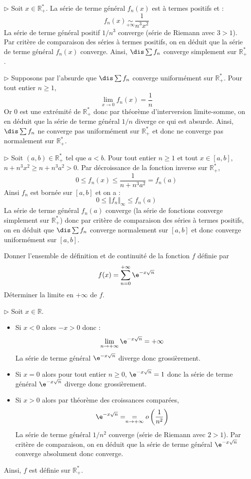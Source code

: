 \documentclass[a4paper,10pt]{report}
\begin{document}
\noindent $\rhd$ Soit $x \in \mathbb{R}_+^*$. La série de terme général $f_n(x)$ est à termes positifs et :
$$ f_n(x) \underset{+ \infty}{\sim} \dfrac{1}{n^3x^2}$$
La série de terme général positif $1/n^3$ converge (série de Riemann avec $3>1$). Par critère de comparaison des séries à termes positifs, on en déduit que la série de terme général $f_n(x)$ converge. Ainsi, $\dis \sum f_n$ converge simplement sur $\mathbb{R}_+^*$.

\medskip

\noindent $\rhd$ Supposons par l'absurde que $\dis \sum f_n$ converge uniformément sur $\mathbb{R}_+^*$. Pour tout entier $n \geq 1$,
$$ \lim_{x \rightarrow 0} f_n(x) = \dfrac{1}{n}$$
Or $0$ est une extrémité de $\mathbb{R}_+^*$ donc par théorème d'interversion limite-somme, on en déduit que la série de terme général $1/n$ diverge ce qui est absurde. Ainsi, $\dis \sum f_n$ ne converge pas uniformément sur $\mathbb{R}_+^*$ et donc ne converge pas normalement sur $\mathbb{R}_+^*$.

\medskip

\noindent $\rhd$ Soit $(a,b) \in \mathbb{R}_+^*$ tel que $a<b$. Pour tout entier $n \geq 1$ et tout $x \in [a,b]$, $n+n^3x^2 \geq n+n^3a^2 >0$. Par décroissance de la fonction inverse sur $\mathbb{R}_+^*$,
$$ 0 \leq f_n(x) \leq \dfrac{1}{n+n^3a^2} = f_n(a)$$
Ainsi $f_n$ est bornée sur $[a,b]$ et on a :
$$ 0 \leq \Vert f_n \Vert_{\infty} \leq f_n(a)$$
La série de terme général $f_n(a)$ converge (la série de fonctions converge simplement sur $\mathbb{R}_+^*$) donc par critère de comparaison des séries à termes positifs, on en déduit que $\dis \sum f_n$ converge normalement sur $[a,b]$ et donc converge uniformément sur $[a,b]$.

\begin{Exercice}{} Donner l'ensemble de définition et de continuité de la fonction $f$ définie par 
  \[
  f(x) = \sum_{n = 0}^{ + \infty} \e^{ - x\sqrt n}
  \]
 Déterminer la limite en $ + \infty$ de $f$.
 \end{Exercice}
 
 
\corr 

\noindent $\rhd$ Soit $x \in \mathbb{R}$.
\begin{itemize}
\item Si $x<0$ alors $-x>0$ donc :
$$ \lim_{n \rightarrow + \infty} \e^{ - x\sqrt n} = + \infty$$
La série de terme général $\e^{ - x\sqrt n}$ diverge donc grossièrement.
\item Si $x=0$ alors pour tout entier $n \geq 0$, $\e^{ - x\sqrt n}=1$ donc la série de terme général $\e^{ - x\sqrt n}$ diverge donc grossièrement.
\item Si $x>0$ alors par théorème des croissances comparées,
$$ \e^{ - x\sqrt n} = \underset{n \rightarrow + \infty}{=} o \left( \dfrac{1}{n^2} \right)$$
La série de terme général $1/n^2$ converge (série de Riemann avec $2>1$). Par critère de comparaison, on en déduit que la série de terme général $ \e^{ - x\sqrt n} $ converge absolument donc converge.
\end{itemize}
Ainsi, $f$ est définie sur $\mathbb{R}_+^*$.
\end{document}
